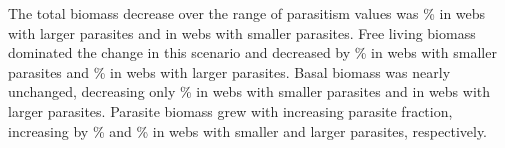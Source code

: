 \documentclass[/home/nkappler/Research/Dissertation/dissertation.tex]{subfiles}
\begin{document}
\begin{bibunit}



\edef\bigBioFracBioDecFree{\pgfmathresult}

\edef\smallBioFracBioDecFree{\pgfmathresult}

 \edef\bigBioPerDelPara{\pgfmathresult}

 \edef\smallBioPerDelPara{\pgfmathresult}

\bigParaTab \edef\bigMeanBioPara{\pgfplotsretval}

\smallParaTab \edef\smallMeanBioPara{\pgfplotsretval}

\pgfmathparse{\bigMeanBioPara/\smallMeanBioPara}
\edef\bigSmallParaRatio{\pgfmathresult}

\edef\bigFreeBigParaParaBio{\bigMeanBioPara}
\edef\bigFreeSmallParaParaBio{\smallMeanBioPara}




The total biomass decrease over the range of parasitism values was
\% in webs with larger
parasites and in webs with smaller parasites. Free living biomass dominated the
change in this scenario and decreased by
\% in webs with smaller
parasites and \% in webs
with larger parasites. Basal biomass was nearly unchanged, decreasing only
\% in webs with smaller
parasites and in webs with larger parasites. Parasite biomass grew with
increasing parasite fraction, increasing by
\% and
\% in webs with smaller and
larger parasites, respectively.


\end{bibunit}
\end{document}
